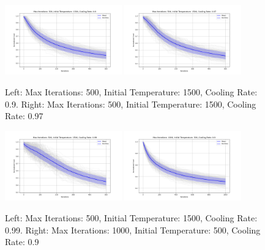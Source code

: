 \documentclass{article}
\begin{document}
    \begin{figure}[H]
        \centering
        \includegraphics[width=0.45\textwidth]{simulated_annealing/appendix/max_iter_500_init_temp_1500_cooling_rate_0.9.png}
        \includegraphics[width=0.45\textwidth]{simulated_annealing/appendix/max_iter_500_init_temp_1500_cooling_rate_0.97.png}
        \caption{Left: Max Iterations: 500, Initial Temperature: 1500, Cooling Rate: 0.9. Right: Max Iterations: 500, Initial Temperature: 1500, Cooling Rate: 0.97}
        \label{fig:sa_500_1500_0.9_500_1500_0.97}
    \end{figure}

    \begin{figure}[H]
        \centering
        \includegraphics[width=0.45\textwidth]{simulated_annealing/appendix/max_iter_500_init_temp_1500_cooling_rate_0.99.png}
        \includegraphics[width=0.45\textwidth]{simulated_annealing/appendix/max_iter_1000_init_temp_500_cooling_rate_0.9.png}
        \caption{Left: Max Iterations: 500, Initial Temperature: 1500, Cooling Rate: 0.99. Right: Max Iterations: 1000, Initial Temperature: 500, Cooling Rate: 0.9}
        \label{fig:sa_500_1500_0.99_1000_500_0.9}
    \end{figure}
\end{document}
